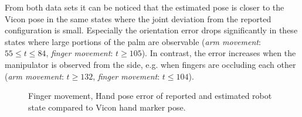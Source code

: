 From both data sets it can be noticed that the estimated pose is closer to the Vicon pose in the same states where the joint deviation from the reported configuration is small. Especially the orientation error drops significantly in these states where large portions of the palm are observable (\textit{arm movement}: $55\leq t \leq84$, \textit{finger movement}: $t \geq 105$). In contrast, the error increases when the manipulator is observed from the side, e.g. when fingers are occluding each other (\textit{arm movement}: $t \geq 132$, \textit{finger movement}: $t \leq 104$).

\begin{figure}
\centering
{}


\caption[Finger movement, hand pose error]{Finger movement, Hand pose error of reported and estimated robot state compared to Vicon hand marker pose.}
\label{fig:vic_error_finger_movement}
\end{figure}


